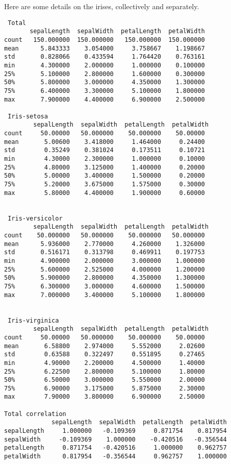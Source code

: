 \documentclass{article}
\begin{document}
Here are some details on the irises, collectively and separately.
\begin{verbatim}
 Total	
       sepalLength  sepalWidth  petalLength  petalWidth
count   150.000000  150.000000   150.000000  150.000000
mean      5.843333    3.054000     3.758667    1.198667
std       0.828066    0.433594     1.764420    0.763161
min       4.300000    2.000000     1.000000    0.100000
25%       5.100000    2.800000     1.600000    0.300000
50%       5.800000    3.000000     4.350000    1.300000
75%       6.400000    3.300000     5.100000    1.800000
max       7.900000    4.400000     6.900000    2.500000

 Iris-setosa 
        sepalLength  sepalWidth  petalLength  petalWidth
count     50.00000   50.000000    50.000000    50.00000
mean       5.00600    3.418000     1.464000     0.24400
std        0.35249    0.381024     0.173511     0.10721
min        4.30000    2.300000     1.000000     0.10000
25%        4.80000    3.125000     1.400000     0.20000
50%        5.00000    3.400000     1.500000     0.20000
75%        5.20000    3.675000     1.575000     0.30000
max        5.80000    4.400000     1.900000     0.60000 


 Iris-versicolor 
        sepalLength  sepalWidth  petalLength  petalWidth
count    50.000000   50.000000    50.000000   50.000000
mean      5.936000    2.770000     4.260000    1.326000
std       0.516171    0.313798     0.469911    0.197753
min       4.900000    2.000000     3.000000    1.000000
25%       5.600000    2.525000     4.000000    1.200000
50%       5.900000    2.800000     4.350000    1.300000
75%       6.300000    3.000000     4.600000    1.500000
max       7.000000    3.400000     5.100000    1.800000 


 Iris-virginica 
        sepalLength  sepalWidth  petalLength  petalWidth
count     50.00000   50.000000    50.000000    50.00000
mean       6.58800    2.974000     5.552000     2.02600
std        0.63588    0.322497     0.551895     0.27465
min        4.90000    2.200000     4.500000     1.40000
25%        6.22500    2.800000     5.100000     1.80000
50%        6.50000    3.000000     5.550000     2.00000
75%        6.90000    3.175000     5.875000     2.30000
max        7.90000    3.800000     6.900000     2.50000 

Total correlation
             sepalLength  sepalWidth  petalLength  petalWidth
sepalLength     1.000000   -0.109369     0.871754    0.817954
sepalWidth     -0.109369    1.000000    -0.420516   -0.356544
petalLength     0.871754   -0.420516     1.000000    0.962757
petalWidth      0.817954   -0.356544     0.962757    1.000000


\end{verbatim}
\end{document}
